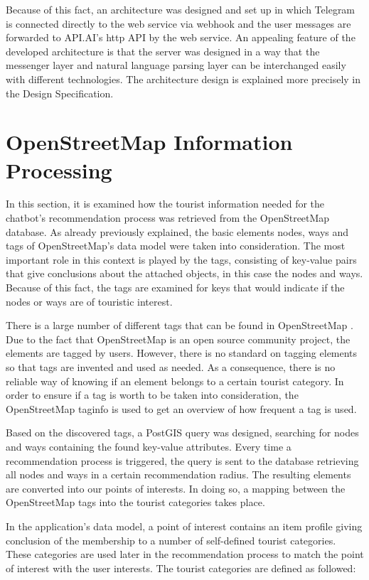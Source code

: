 Because of this fact, an architecture was designed and set up in which Telegram is connected directly to the web service via webhook and the user messages are forwarded to API.AI’s http API by the web service. An appealing feature of the developed architecture is that the server was designed in a way that the messenger layer and natural language parsing layer can be interchanged easily with different technologies. The architecture design is explained more precisely in the Design Specification.

\section{OpenStreetMap Information Processing}
In this section, it is examined how the tourist information needed for the chatbot’s recommendation process was retrieved from the OpenStreetMap database. As already previously explained, the basic elements nodes, ways and tags of OpenStreetMap’s data model were taken into consideration. The most important role in this context is played by the tags, consisting of key-value pairs that give conclusions about the attached objects, in this case the nodes and ways. Because of this fact, the tags are examined for keys that would indicate if the nodes or ways are of touristic interest.

There is a large number of different tags that can be found in OpenStreetMap \cite{osm:map_features}. Due to the fact that OpenStreetMap is an open source community project, the elements are tagged by users. However, there is no standard on tagging elements so that tags are invented and used as needed. As a consequence, there is no reliable way of knowing if an element belongs to a certain tourist category. In order to ensure if a tag is worth to be taken into consideration, the OpenStreetMap taginfo \cite{osm:taginfo} is used to get an overview of how frequent a tag is used.

Based on the discovered tags, a PostGIS query was designed, searching for nodes and ways containing the found key-value attributes. Every time a recommendation process is triggered, the query is sent to the database retrieving all nodes and ways in a certain recommendation radius. The resulting elements are converted into our points of interests. In doing so, a mapping between the OpenStreetMap tags into the tourist categories takes place.

In the application’s data model, a point of interest contains an item profile giving conclusion of the membership to a number of self-defined tourist categories. These categories are used later in the recommendation process to match the point of interest with the user interests. The tourist categories are defined as followed:

